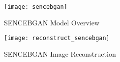 \begin{figure}[h!]
	\centering
	\texttt{[image: sencebgan]}
	\caption{SENCEBGAN Model Overview }
	\label{fig:sencebgan_model}
\end{figure}

\begin{figure}[h!]
	\centering
	\texttt{[image: reconstruct\_sencebgan]}
	\caption{SENCEBGAN Image Reconstruction  }
	\label{fig:sencebgan_model}
\end{figure}



\endgroup